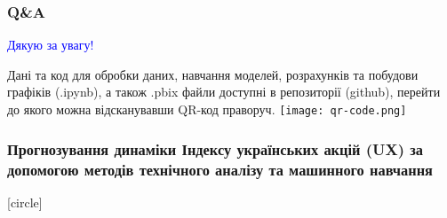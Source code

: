 \documentclass[aspectratio=169]{beamer}
\begin{document}
\begin{frame}
\frametitle{Q\&A}
\begin{center}
\bigskip
\textcolor{blue}{\huge Дякую за увагу!} \\
\end{center}
\begin{multicols}{2}

\vbox{\vspace{0.8cm}}
Дані та код для обробки даних, навчання моделей, розрахунків та побудови графіків (.ipynb), а також .pbix файли доступні в репозиторії (github), перейти до якого можна відсканувавши QR-код праворуч.
\columnbreak
\hspace{5mm}
\texttt{[image: qr-code.png]}
\end{multicols}
\end{frame}

\begin{frame}
\frametitle {Прогнозування динаміки Індексу українських акцій (UX) за допомогою методів технічного аналізу та машинного навчання}
[circle]
\tableofcontents
\end{frame}
\end{document}
